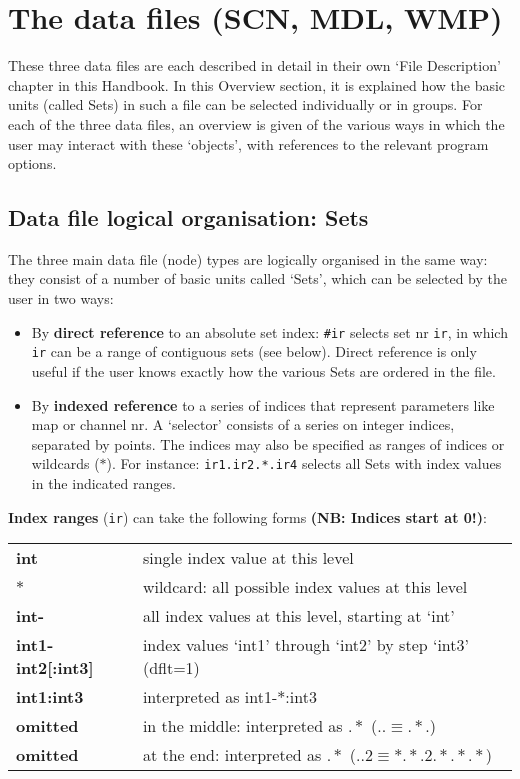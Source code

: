 \section{The \NEWSTAR data files (SCN, MDL, WMP)} 

	These three \NEWSTAR data files are each described in detail in their
own `File Description' chapter in this Handbook.  In this Overview section, it
is explained how the basic units (called Sets) in such a file can be selected
individually or in groups.  For each of the three data files, an overview is
given of the various ways in which the user may interact with these `objects',
with references to the relevant program options. 



\subsection{Data file logical organisation: Sets} 
\label{data.sets} 

	The three main \NEWSTAR data file (node) types are logically organised
in the same way: they consist of a number of basic units called `Sets', which
can be selected by the user in two ways: 

\begin{itemize} 
\item 
	By {\bf direct reference} to an absolute set index: {\tt \#ir} selects
set nr {\tt ir}, in which {\tt ir} can be a range of contiguous sets (see
below).  Direct reference is only useful if the user knows exactly how the
various Sets are ordered in the file. 

\item 
	By {\bf indexed reference} to a series of indices that represent
parameters like map or channel nr.  A `selector' consists of a series on
integer indices, separated by points.  The indices may also be specified as
ranges of indices or wildcards ($\ast$).  For instance: {\tt ir1.ir2.*.ir4}
selects all Sets with index values in the indicated ranges. 
\end{itemize} 

	{\bf Index ranges} ({\tt ir}) can take the following forms {\bf (NB: 
Indices start at 0!)}: 

\begin{tabular}{ll} {\bf int}               &single index value at this level 
\\ {\bf $\ast$}            &wildcard: all possible index values at this level 
\\ {\bf int-}              &all index values at this level, starting at `int' 
\\ {\bf int1-int2[:int3]}  & 
		index values `int1' through `int2' by step `int3' (dflt=1) \\
{\bf int1:int3}         &interpreted as int1-$\ast$:int3 \\ {\bf omitted} 
    &in the middle: interpreted as $.\ast$ 
				($.. \equiv .\ast.$) \\ {\bf omitted} 
&at the end: interpreted as $.\ast$ 
				($..2 \equiv \ast.\ast.2.\ast.\ast.\ast$) \\ 
\end{tabular} 


